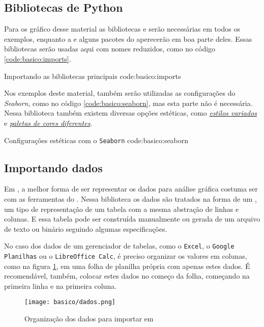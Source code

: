 \subsection{Bibliotecas de Python}

    Para os gráfico desse material as bibliotecas \pandas e \matplotlib serão necessárias em todos os exemplos, enquanto a \numpy e alguns pacotes do \scipy aperecerão em boa parte deles. Essas bibliotecas serão usadas aqui com nomes reduzidos, como no código \ref{code:basico:imports}.

    {Importando as bibliotecas principais}
    {code:basico:imports}

    Nos exemplos deste material, também serão utilizadas as configurações do \textit{Seaborn}, como no código \ref{code:basico:seaborn}, mas esta parte não é necessária. Nessa biblioteca também existem diversas opções estéticas, como \href{https://seaborn.pydata.org/tutorial/aesthetics.html}{\emph{estilos variados}} e \href{https://seaborn.pydata.org/tutorial/color_palettes.html}{\emph{paletas de cores diferentes}}.

    {Configurações estéticas com o \texttt{Seaborn}}
    {code:basico:seaborn}


\subsection{Importando dados}

    Em \python, a melhor forma de ser representar os dados para análise gráfica costuma ser com as ferramentas do \pandas. Nessa biblioteca os dados são tratados na forma de um \dataframe, um tipo de representação de um tabela com a mesma abstração de linhas e colunas. E essa tabela pode ser construída manualmente ou gerada de um arquivo de texto ou binário seguindo algumas especificações.

    No caso dos dados de um gerenciador de tabelas, como o \texttt{Excel}, o \texttt{Google Planilhas} ou o \texttt{LibreOffice Calc}, é preciso organizar os valores em colunas, como na figura \ref{fig:basico:dados}, em uma folha de planilha própria com apenas estes dados.  É recomendável, também, colocar estes dados no começo da folha, começando na primeira linha e na primeira coluna.

    \begin{figure}
        \centering
        \texttt{[image: basico/dados.png]}

        \caption{Organização dos dados para importar em \python}
        \label{fig:basico:dados}
    \end{figure}

